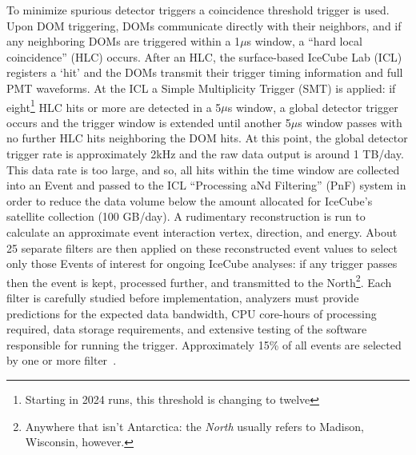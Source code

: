 \documentclass[main.tex]{subfiles}
\begin{document}
To minimize spurious detector triggers a coincidence threshold trigger is used. 
Upon DOM triggering, DOMs communicate directly with their neighbors, and if any neighboring DOMs are triggered within a 1$\mu$s window, a ``hard local coincidence'' (HLC) occurs.
After an HLC, the surface-based IceCube Lab (ICL) registers a `hit' and the DOMs transmit their trigger timing information and full PMT waveforms.
At the ICL a Simple Multiplicity Trigger (SMT) is applied: if eight\footnote{Starting in 2024 runs, this threshold is changing to twelve} HLC hits or more are detected in a 5$\mu$s window, a global detector trigger occurs and the trigger window is extended until another 5$\mu$s window passes with no further HLC hits neighboring the DOM hits. 
At this point, the global detector trigger rate is approximately 2kHz and the raw data output is around 1 TB/day. 
This data rate is too large, and so, all hits within the time window are collected into an Event and passed to the ICL ``Processing aNd Filtering'' (PnF) system in order to reduce the data volume below the amount allocated for IceCube's satellite collection (100 GB/day). 
A rudimentary reconstruction is run to calculate an approximate event interaction vertex, direction, and energy. 
About 25 separate filters are then applied on these reconstructed event values to select only those Events of interest for ongoing IceCube analyses: if any trigger passes then the event is kept, processed further, and transmitted to the North\footnote{Anywhere that isn't Antarctica: the \textit{North} usually refers to Madison, Wisconsin, however.}. 
Each filter is carefully studied before implementation, analyzers must provide predictions for the expected data bandwidth, CPU core-hours of processing required, data storage requirements, and extensive testing of the software responsible for running the trigger. 
Approximately 15\% of all events are selected by one or more filter~\cite{Aartsen_2017}. 
\end{document}
